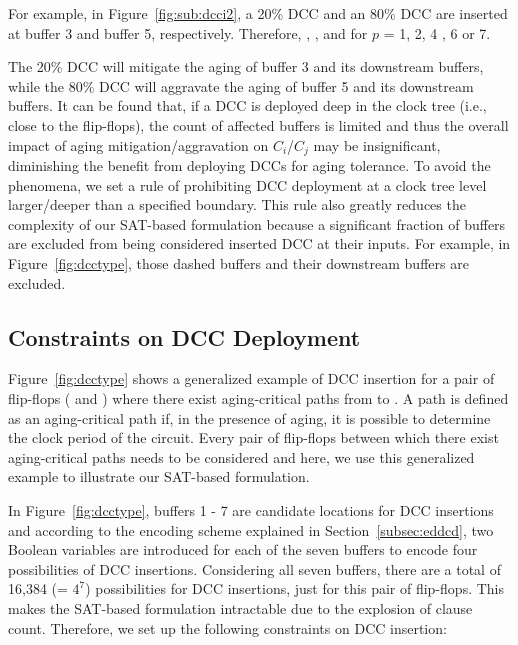 For example, in Figure~\ref{fig:sub:dcci2}, a 20\% DCC and an 80\% DCC are inserted at buffer 3 and buffer 5, respectively. Therefore, {}, {}, and {} for $p$ = 1, 2, 4 , 6 or 7.

The 20\% DCC will mitigate the aging of buffer 3 and its downstream buffers, while the 80\% DCC will aggravate the aging of buffer 5 and its downstream buffers. It can be found that, if a DCC is deployed deep in the clock tree (i.e., close to the flip-flops), the count of affected buffers is limited and thus the overall impact of aging mitigation/aggravation on $C_i$/$C_j$ may be insignificant, diminishing the benefit from deploying DCCs for aging tolerance.  To avoid the phenomena, we set a rule of prohibiting DCC deployment at a clock tree level larger/deeper than a specified boundary. This rule also greatly reduces the complexity of our SAT-based formulation because a significant fraction of buffers are excluded from being considered inserted DCC at their inputs. For example, in Figure~\ref{fig:dcctype}, those dashed buffers and their downstream buffers are excluded. 

\subsection{Constraints on DCC Deployment}
\label{subsec:dccccc}

Figure~\ref{fig:dcctype} shows a generalized example of DCC insertion for a pair of flip-flops ( and ) where there exist aging-critical paths from  to . A path is defined as an aging-critical path if, in the presence of aging, it is possible to determine the clock period of the circuit. Every pair of flip-flops between which there exist aging-critical paths needs to be considered and here, we use this generalized example to illustrate our SAT-based formulation.

In Figure~\ref{fig:dcctype}, buffers 1 - 7 are candidate locations for DCC insertions and according to the encoding scheme explained in Section~\ref{subsec:eddcd}, two Boolean variables are introduced for each of the seven buffers to encode four possibilities of DCC insertions. Considering all seven buffers, there are a total of 16,384 (= $4^7$) possibilities for DCC insertions, just for this pair of flip-flops. This makes the SAT-based formulation intractable due to the explosion of clause count. Therefore, we set up the following constraints on DCC insertion: 

